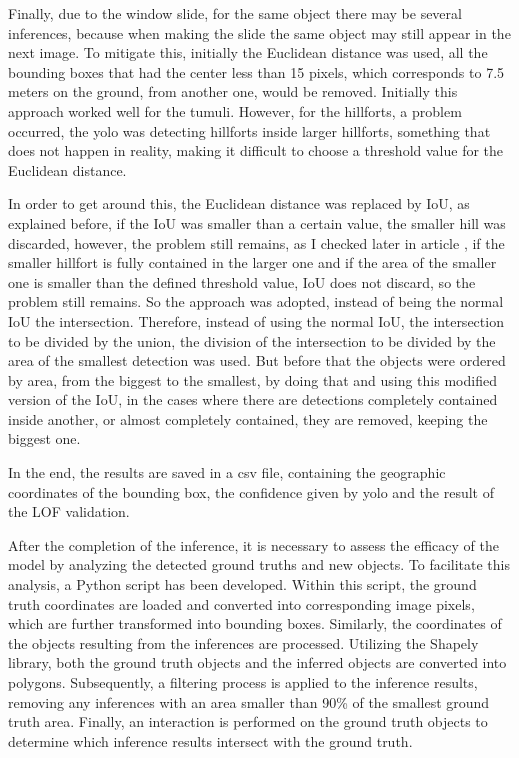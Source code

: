 Finally, due to the window slide, for the same object there may be several inferences, because when making the slide the same object may still appear in the next image. To mitigate this, initially the Euclidean distance was used, all the bounding boxes that had the center less than 15 pixels, which corresponds to 7.5 meters on the ground, from another one, would be removed. Initially this approach worked well for the tumuli. However, for the hillforts, a problem occurred, the yolo was detecting hillforts inside larger hillforts, something that does not happen in reality, making it difficult to choose a threshold value for the Euclidean distance. 

In order to get around this, the Euclidean distance was replaced by IoU, as explained before, if the IoU was smaller than a certain value, the smaller hill was discarded, however, the problem still remains, as I checked later in article \cite{IOUpaper}, if the smaller hillfort is fully contained in the larger one and if the area of the smaller one is smaller than the defined threshold value, IoU does not discard, so the problem still remains. So the approach was adopted, instead of being the normal IoU the intersection. Therefore, instead of using the normal IoU, the intersection to be divided by the union, the division of the intersection to be divided by the area of the smallest detection was used. But before that the objects were ordered by area, from the biggest to the smallest, by doing that and using this modified version of the IoU, in the cases where there are detections completely contained inside another, or almost completely contained, they are removed, keeping the biggest one.

In the end, the results are saved in a csv file, containing the geographic coordinates of the bounding box, the confidence given by yolo and the result of the LOF validation.

After the completion of the inference, it is necessary to assess the efficacy of the model by analyzing the detected ground truths and new objects. To facilitate this analysis, a Python script has been developed. Within this script, the ground truth coordinates are loaded and converted into corresponding image pixels, which are further transformed into bounding boxes. Similarly, the coordinates of the objects resulting from the inferences are processed. Utilizing the Shapely library, both the ground truth objects and the inferred objects are converted into polygons. Subsequently, a filtering process is applied to the inference results, removing any inferences with an area smaller than 90\% of the smallest ground truth area. Finally, an interaction is performed on the ground truth objects to determine which inference results intersect with the ground truth.

